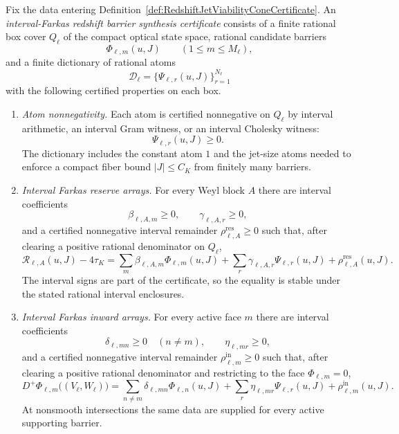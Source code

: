 \begin{definition}\label{def:IntervalFarkasRedshiftBarrierSynthesisCertificate}
Fix the data entering Definition~\ref{def:RedshiftJetViabilityConeCertificate}.
An \emph{interval-Farkas redshift barrier synthesis certificate} consists of a
finite rational box cover $Q_\ell$ of the compact optical state space, rational
candidate barriers
\[
    \Phi_{\ell,m}(u,J)\qquad(1\le m\le M_\ell),
\]
and a finite dictionary of rational atoms
\[
    \mathcal D_\ell=\{\Psi_{\ell,r}(u,J)\}_{r=1}^{N_\ell}
\]
with the following certified properties on each box.
\begin{enumerate}
    \item \emph{Atom nonnegativity.}  Each atom is certified nonnegative on
    $Q_\ell$ by interval arithmetic, an interval Gram witness, or an interval
    Cholesky witness:
    \[
        \Psi_{\ell,r}(u,J)\ge0 .
    \]
    The dictionary includes the constant atom $1$ and the jet-size atoms needed
    to enforce a compact fiber bound $|J|\le C_K$ from finitely many barriers.

    \item \emph{Interval Farkas reserve arrays.}  For every Weyl block $A$
    there are interval coefficients
    \[
        \beta_{\ell,A,m}\ge0,\qquad
        \gamma_{\ell,A,r}\ge0,
    \]
    and a certified nonnegative interval remainder
    $\rho_{\ell,A}^{\mathrm{res}}\ge0$ such that, after clearing a positive
    rational denominator on $Q_\ell$,
    \[
        \mathcal R_{\ell,A}(u,J)-4\tau_K
        =
        \sum_m\beta_{\ell,A,m}\Phi_{\ell,m}(u,J)
        +
        \sum_r\gamma_{\ell,A,r}\Psi_{\ell,r}(u,J)
        +
        \rho_{\ell,A}^{\mathrm{res}}(u,J).
    \]
    The interval signs are part of the certificate, so the equality is stable
    under the stated rational interval enclosures.

    \item \emph{Interval Farkas inward arrays.}  For every active face $m$ there
    are interval coefficients
    \[
        \delta_{\ell,mn}\ge0\quad(n\ne m),
        \qquad
        \eta_{\ell,mr}\ge0,
    \]
    and a certified nonnegative interval remainder
    $\rho_{\ell,m}^{\mathrm{in}}\ge0$ such that, after clearing a positive
    rational denominator and restricting to the face $\Phi_{\ell,m}=0$,
    \[
        D^+\Phi_{\ell,m}\bigl((V_\ell,W_\ell)\bigr)
        =
        \sum_{n\ne m}\delta_{\ell,mn}\Phi_{\ell,n}(u,J)
        +
        \sum_r\eta_{\ell,mr}\Psi_{\ell,r}(u,J)
        +
        \rho_{\ell,m}^{\mathrm{in}}(u,J).
    \]
    At nonsmooth intersections the same data are supplied for every active
    supporting barrier.


\end{enumerate}
\end{definition}

